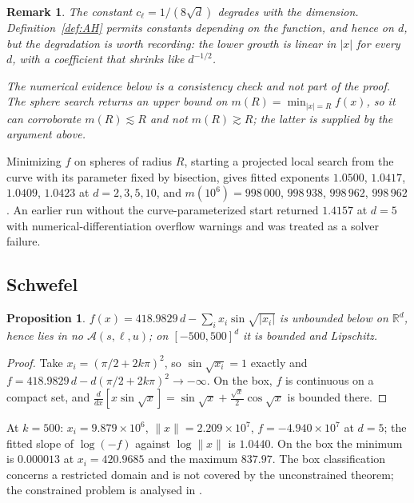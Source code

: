 \documentclass[pdflatex,sn-mathphys-num]{sn-jnl}
\theoremstyle{thmstyleone}
\newtheorem{proposition}[theorem]{Proposition}
\theoremstyle{thmstyletwo}
\newtheorem{remark}{Remark}
\theoremstyle{thmstylethree}
\begin{document}
\begin{remark}\label{rem:rosen}
The constant $c_\ell=1/(8\sqrt d)$ degrades with the dimension. Definition~\ref{def:AH} permits constants depending on the function, and hence on $d$, but the degradation is worth recording: the lower growth is linear in $|x|$ for every $d$, with a coefficient that shrinks like $d^{-1/2}$.

The numerical evidence below is a consistency check and not part of the proof. The sphere search returns an \emph{upper} bound on $m(R)=\min_{|x|=R}f(x)$, so it can corroborate $m(R)\lesssim R$ and not $m(R)\gtrsim R$; the latter is supplied by the argument above.
\end{remark}

Minimizing $f$ on spheres of radius $R$, starting a projected local search from the curve with its parameter fixed by bisection, gives fitted exponents $1.0500$, $1.0417$, $1.0409$, $1.0423$ at $d=2,3,5,10$, and $m(10^6)=998\,000$, $998\,938$, $998\,962$, $998\,962$. An earlier run without the curve-parameterized start returned $1.4157$ at $d=5$ with numerical-differentiation overflow warnings and was treated as a solver failure.

\subsection{Schwefel}\label{sec:schwefel}

\begin{proposition}
$f(x)=418.9829\,d-\sum_i x_i\sin\sqrt{|x_i|}$ is unbounded below on $\mathbb R^d$, hence lies in no $\mathcal A(s,\ell,u)$; on $[-500,500]^d$ it is bounded and Lipschitz.
\end{proposition}

\begin{proof}
Take $x_i=(\pi/2+2k\pi)^2$, so $\sin\sqrt{x_i}=1$ exactly and $f=418.9829\,d-d(\pi/2+2k\pi)^2\to-\infty$. On the box, $f$ is continuous on a compact set, and $\frac{d}{dx}[x\sin\sqrt x]=\sin\sqrt x+\frac{\sqrt x}2\cos\sqrt x$ is bounded there.
\end{proof}

At $k=500$: $x_i=9.879\times10^6$, $\|x\|=2.209\times10^7$, $f=-4.940\times10^7$ at $d=5$; the fitted slope of $\log(-f)$ against $\log\|x\|$ is $1.0440$. On the box the minimum is $0.000013$ at $x_i=420.9685$ and the maximum $837.97$. The box classification concerns a restricted domain and is not covered by the unconstrained theorem; the constrained problem is analysed in \cite{borghi2023,beddrich2024}.
\end{document}
